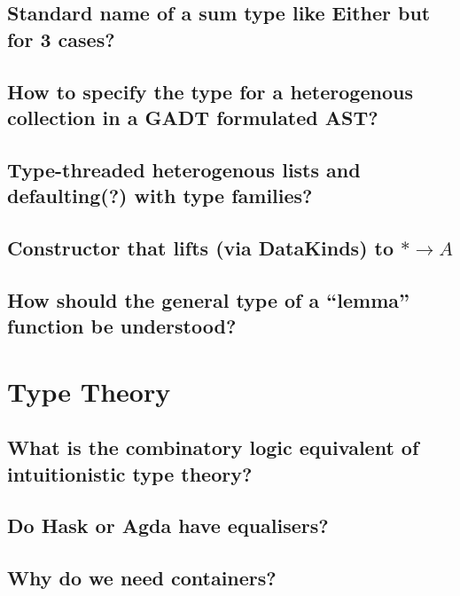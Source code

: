 \documentclass{book}
\begin{document}
\section{Standard name of a sum type like Either but for 3 cases?}


\section{How to specify the type for a heterogenous collection in a GADT formulated AST?}


\section{Type-threaded heterogenous lists and defaulting(?) with type families?}


\section{Constructor that lifts (via DataKinds) to $\ast\to A$}


\section{How should the general type of a ``lemma'' function be understood?}



\chapter{Type Theory}

\section{What is the combinatory logic equivalent of intuitionistic type theory?}


\section{Do Hask or Agda have equalisers?}


\section{Why do we need containers?}

\end{document}
